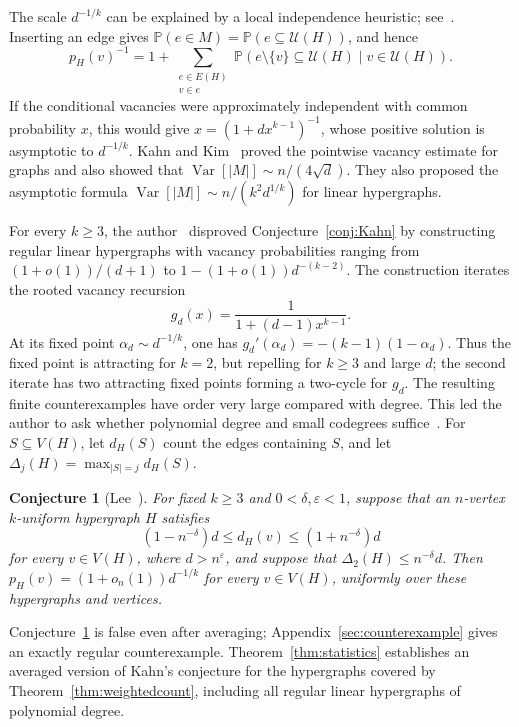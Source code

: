 \documentclass[11pt,reqno]{amsart}
\numberwithin{equation}{section}
\theoremstyle{plain}
\newtheorem{conjecture}[theorem]{Conjecture}
\theoremstyle{definition}
\newcommand{\Prob}{\mathbb P}
\newcommand{\Var}{\operatorname{Var}}
\newcommand{\eps}{\varepsilon}
\newcommand{\calU}{\mathcal U}
\begin{document}
The scale $d^{-1/k}$ can be explained by a local independence heuristic; see~\cite[Section~1]{Lee}.
Inserting an edge gives $\Prob(e\in M)=\Prob(e\subseteq\calU(H))$, and hence
\begin{equation}\label{eq:vacancyheuristic}
    p_H(v)^{-1}=1+\sum_{\substack{e\in E(H)\\v\in e}}
    \Prob(e\setminus\{v\}\subseteq\calU(H)\mid v\in\calU(H)).
\end{equation}
If the conditional vacancies were approximately independent with common probability $x$, this would give $x=(1+dx^{k-1})^{-1}$, whose positive solution is asymptotic to $d^{-1/k}$.
Kahn and Kim~\cite{KK} proved the pointwise vacancy estimate for graphs and also showed that $\Var[|M|]\sim n/(4\sqrt d)$.
They also proposed the asymptotic formula $\Var[|M|]\sim n/(k^2d^{1/k})$ for linear hypergraphs.

For every $k\ge3$, the author~\cite{Lee} disproved Conjecture~\ref{conj:Kahn} by constructing regular linear hypergraphs with vacancy probabilities ranging from $(1+o(1))/(d+1)$ to $1-(1+o(1))d^{-(k-2)}$.
The construction iterates the rooted vacancy recursion
\[
    g_d(x)=\frac1{1+(d-1)x^{k-1}}.
\]
At its fixed point $\alpha_d\sim d^{-1/k}$, one has $g_d'(\alpha_d)=-(k-1)(1-\alpha_d)$.
Thus the fixed point is attracting for $k=2$, but repelling for $k\ge3$ and large $d$; the second iterate has two attracting fixed points forming a two-cycle for $g_d$.
The resulting finite counterexamples have order very large compared with degree.
This led the author to ask whether polynomial degree and small codegrees suffice~\cite[Conjecture~5.2]{Lee}.
For $S\subseteq V(H)$, let $d_H(S)$ count the edges containing $S$, and let $\Delta_j(H)=\max_{|S|=j}d_H(S)$.

\begin{conjecture}[Lee~{\cite[Conjecture~5.2]{Lee}}]\label{conj:Lee}
    For fixed $k\ge3$ and $0<\delta,\eps<1$, suppose that an $n$-vertex $k$-uniform hypergraph $H$ satisfies
    \[
        (1-n^{-\delta})d\le d_H(v)\le(1+n^{-\delta})d
    \]
    for every $v\in V(H)$, where $d>n^\eps$, and suppose that $\Delta_2(H)\le n^{-\delta}d$.
    Then $p_H(v)=(1+o_n(1))d^{-1/k}$ for every $v\in V(H)$, uniformly over these hypergraphs and vertices.
\end{conjecture}

Conjecture~\ref{conj:Lee} is false even after averaging; Appendix~\ref{sec:counterexample} gives an exactly regular counterexample.
Theorem~\ref{thm:statistics} establishes an averaged version of Kahn's conjecture for the hypergraphs covered by Theorem~\ref{thm:weightedcount}, including all regular linear hypergraphs of polynomial degree.
\end{document}
